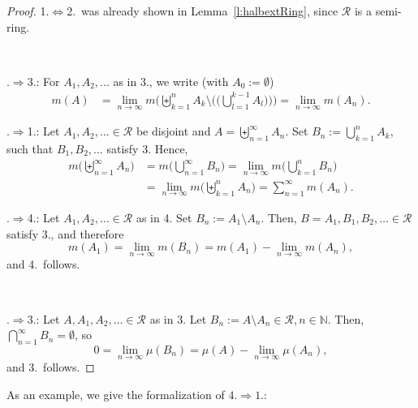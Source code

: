 \documentclass[lean]{AFM}
\begin{document}
\begin{proof}
  1.$\Leftrightarrow$2.\ was already shown in
  Lemma~\ref{l:halbextRing}, since $\mathcal R$ is a semi-ring.

  ~

  .$\Rightarrow$3.: For $A_1, A_2,...$ as in 3., we write
  (with $A_0 := \emptyset$)
  \begin{align*}
     m(A) & %
     = \lim_{n\to\infty}
     m\Big( \biguplus_{k=1}^n A_k \setminus \Big(\Big(\bigcup_{l=1}^{k-1}
     A_l\Big)\Big)\Big) = \lim_{n\to\infty} m(A_n).
  \end{align*}

  .$\Rightarrow$1.: Let $A_1, A_2,... \in \mathcal R$ be
  disjoint and $A = \biguplus_{n=1}^\infty A_n$. Set $B_n :=
  \bigcup_{k=1}^n A_k$, such that $B_1, B_2,...$ satisfy 3. Hence,
  \begin{align*}
    m\Big( \biguplus_{n=1}^\infty A_n\Big) & = m\Big(
    \bigcup_{n=1}^\infty B_n\Big) = \lim_{n\to\infty} m\Big(
    \bigcup_{k=1}^n B_n\Big) \\ & = \lim_{n\to\infty} m\Big(
    \biguplus_{k=1}^n A_n\Big) = \sum_{n=1}^\infty m(A_n).
  \end{align*}

  .$\Rightarrow$4.: Let $A_1, A_2,\dots \in\mathcal R$ as
  in 4. Set $B_n := A_1\setminus A_n$. Then, $B=A_1,B_1,B_2,\dots
  \in\mathcal R$ satisfy 3., and therefore
  $$m(A_1) = \lim_{n\to\infty} m(B_n) = m(A_1) -
  \lim_{n\to\infty}m(A_n),$$ and 4.\ follows.

  ~

  .$\Rightarrow$3.: Let $A,A_1,A_2,\dots \in\mathcal R$ as
  in 3. Let $B_n := A\setminus A_n \in \mathcal R, n\in\mathbb
  N$. Then, $\bigcap_{n=1}^\infty B_n = \emptyset$, so $$0 =
  \lim_{n\to\infty} \mu(B_n) = \mu(A) - \lim_{n\to\infty} \mu(A_n),$$
  and 3.\ follows.
\end{proof}

\noindent
As an example, we give the formalization of $4.\Rightarrow 1.$:

\end{document}
